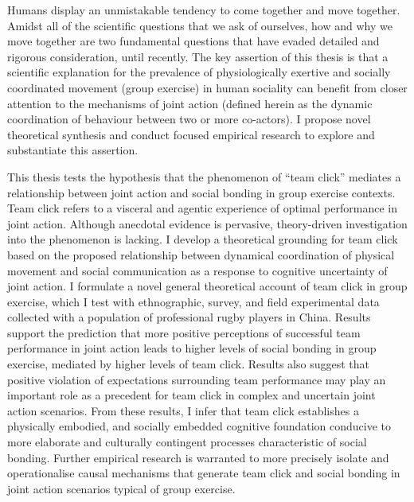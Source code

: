 Humans display an unmistakable tendency to come together and move together.  Amidst all of the scientific questions that we ask of ourselves, how and why we move together are two fundamental questions that have evaded detailed and rigorous consideration, until recently.  The key assertion of this thesis is that a scientific explanation for the prevalence of physiologically exertive and socially coordinated movement (group exercise) in human sociality can benefit from closer attention to the mechanisms of joint action (defined herein as the dynamic coordination of behaviour between two or more co-actors).  I propose novel theoretical synthesis and conduct focused empirical research to explore and substantiate this assertion.

This thesis tests the hypothesis that the phenomenon of ``team click'' mediates a relationship between joint action and social bonding in group exercise contexts.  Team click refers to a visceral and agentic experience of optimal performance in joint action.  Although anecdotal evidence is pervasive, theory-driven investigation into the phenomenon is lacking.  I develop a theoretical grounding for team click based on the proposed relationship between dynamical coordination of physical movement and social communication as a response to cognitive uncertainty of joint action.  I formulate a novel general theoretical account of team click in group exercise, which I test with ethnographic, survey, and field experimental data collected with a population of professional rugby players in China.  Results support the prediction that more positive perceptions of successful team performance in joint action leads to higher levels of social bonding in group exercise, mediated by higher levels of team click.  Results also suggest that positive violation of expectations surrounding team performance may play an important role as a precedent for team click in complex and uncertain joint action scenarios.  From these results, I infer that team click establishes a physically embodied, and socially embedded cognitive foundation conducive to more elaborate and culturally contingent processes characteristic of social bonding.  Further empirical research is warranted to more precisely isolate and operationalise causal mechanisms that generate team click and social bonding in joint action scenarios typical of group exercise.



